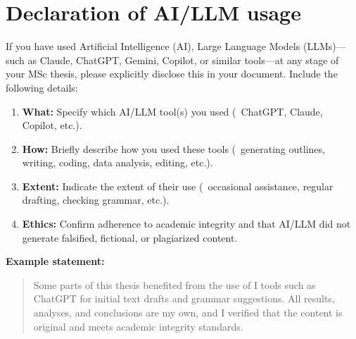 
\chapter{Declaration of AI/LLM usage}

If you have used Artificial Intelligence (AI), Large Language Models (LLMs)---such as Claude, ChatGPT, Gemini, Copilot, or similar tools---at any stage of your MSc thesis, please explicitly disclose this in your document. 
Include the following details:
\begin{enumerate}
  \item \textbf{What:} Specify which AI/LLM tool(s) you used (\eg\ ChatGPT, Claude, Copilot, etc.).
  \item \textbf{How:} Briefly describe how you used these tools (\eg\ generating outlines, writing, coding, data analysis, editing, etc.).
  \item \textbf{Extent:} Indicate the extent of their use (\eg\ occasional assistance, regular drafting, checking grammar, etc.).
  \item \textbf{Ethics:} Confirm adherence to academic integrity and that AI/LLM did not generate falsified, fictional, or plagiarized content.
\end{enumerate}


\noindent \textbf{Example statement:}

\begin{quote}
Some parts of this thesis benefited from the use of I tools such as ChatGPT for initial text drafts and grammar suggestions. 
All results, analyses, and conclusions are my own, and I verified that the content is original and meets academic integrity standards.
\end{quote}
